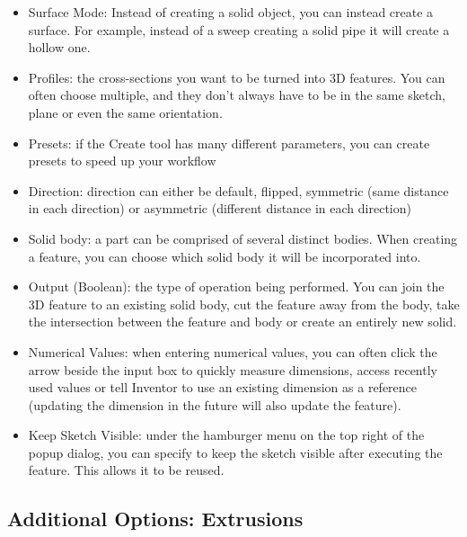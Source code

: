 \begin{itemize}

\item Surface Mode: Instead of creating a solid object, you can instead create a surface. For example, instead of a sweep creating a solid pipe it will create a hollow one.
\item Profiles: the cross-sections you want to be turned into 3D features. You can often choose multiple, and they don't always have to be in the same sketch, plane or even the same orientation.
\item Presets: if the Create tool has many different parameters, you can create presets to speed up your workflow
\item Direction: direction can either be default, flipped, symmetric (same distance in each direction) or asymmetric (different distance in each direction)
\item Solid body: a part can be comprised of several distinct bodies. When creating a feature, you can choose which solid body it will be incorporated into.
\item Output (Boolean): the type of operation being performed. You can join the 3D feature to an existing solid body, cut the feature away from the body, take the intersection between the feature and body or create an entirely new solid.
\item Numerical Values: when entering numerical values, you can often click the arrow beside the input box to quickly measure dimensions, access recently used values or tell Inventor to use an existing dimension as a reference (updating the dimension in the future will also update the feature).
\item Keep Sketch Visible: under the hamburger menu on the top right of the popup dialog, you can specify to keep the sketch visible after executing the feature. This allows it to be reused.

\end{itemize}

\subsection{Additional Options: Extrusions}

